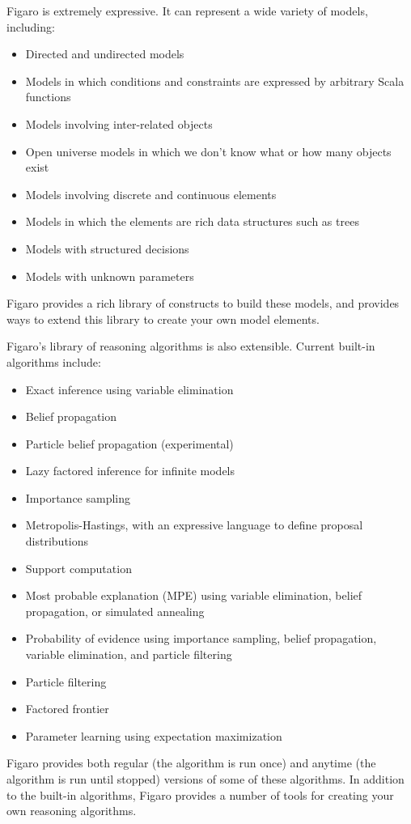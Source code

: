 Figaro is extremely expressive. It can represent a wide variety of models, including:
\begin{itemize}
\item Directed and undirected models
\item Models in which conditions and constraints are expressed by arbitrary Scala functions
\item Models involving inter-related objects
\item Open universe models in which we don't know what or how many objects exist
\item Models involving discrete and continuous elements
\item Models in which the elements are rich data structures such as trees
\item Models with structured decisions
\item Models with unknown parameters
\end{itemize}

Figaro provides a rich library of constructs to build these models, and provides ways to extend this library to create your own model elements.

Figaro's library of reasoning algorithms is also extensible. Current built-in algorithms include:
\begin{itemize}
\item Exact inference using variable elimination
\item Belief propagation
\item Particle belief propagation (experimental)
\item Lazy factored inference for infinite models
\item Importance sampling
\item Metropolis-Hastings, with an expressive language to define proposal distributions
\item Support computation
\item Most probable explanation (MPE) using variable elimination, belief propagation, or simulated annealing
\item Probability of evidence using importance sampling, belief propagation, variable elimination, and particle filtering
\item Particle filtering
\item Factored frontier
\item Parameter learning using expectation maximization
\end{itemize}

Figaro provides both regular (the algorithm is run once) and anytime (the algorithm is run until stopped) versions of some of these algorithms. In addition to the built-in algorithms, Figaro provides a number of tools for creating your own reasoning algorithms.

